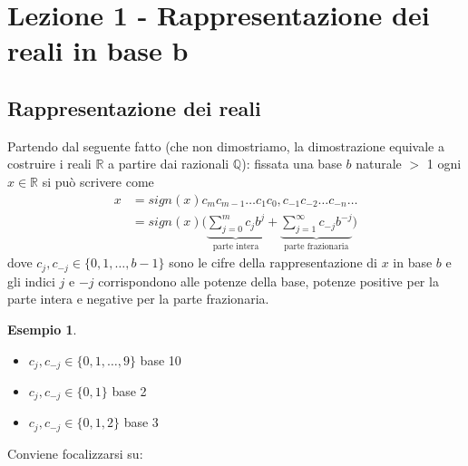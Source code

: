 \documentclass[12pt]{article}
\newtheorem*{esempio}{Esempio}
\begin{document}
\section{Lezione 1 - Rappresentazione dei reali in base b}
\subsection{Rappresentazione dei reali}
Partendo dal seguente fatto (che non dimostriamo, la dimostrazione equivale a costruire i reali $\mathbb{R}$ a partire dai razionali $\mathbb{Q}$): fissata una base $b$ naturale $>$ 1 ogni $x \in \mathbb{R}$ si può scrivere come
\[ \begin{split}
    x & = sign(x)c_mc_{m-1} \dotsc c_1c_0,c_{-1}c_{-2} \dotsc c_{-n} \dotsc \\
    & = sign(x) \biggl( \underbrace{\sum_{j=0}^m c_j b^j}_{\text {parte intera}} + %
    \underbrace{\sum_{j=1}^\infty c_{-j} b^{-j}}_{\text {parte frazionaria}} \biggr) 
\end{split} \]
dove $c_j,c_{-j} \in \{0,1,\dotsc,b-1\}$ sono le cifre della rappresentazione di $x$ in base $b$ e gli indici $j$ e $-j$ corrispondono alle potenze della base, potenze positive per la parte intera e negative per la parte frazionaria.

\begin{esempio} \end{esempio}
\begin{itemize}
    \item $c_j,c_{-j} \in \{0,1,\dotsc,9\}$ base 10
    \item $c_j,c_{-j} \in \{0,1\}$ base 2
    \item $c_j,c_{-j} \in \{0,1,2\}$ base 3
\end{itemize}
Conviene focalizzarsi su:
\end{document}
